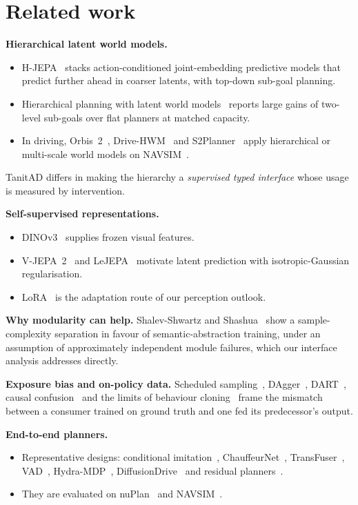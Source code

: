\documentclass[10pt,twocolumn]{article}
\theoremstyle{remark}
\begin{document}
\section{Related work}
\textbf{Hierarchical latent world models.}
\begin{itemize}
  \item H-JEPA~\cite{hjepa} stacks action-conditioned joint-embedding predictive models that predict further ahead in coarser latents,
        with top-down sub-goal planning.
  \item Hierarchical planning with latent world models~\cite{hplwm} reports large gains of two-level sub-goals over flat planners at
        matched capacity.
  \item In driving, Orbis~2~\cite{orbis2}, Drive-HWM~\cite{drivehwm} and S2Planner~\cite{s2planner} apply hierarchical or multi-scale
        world models on NAVSIM~\cite{navsim}.
\end{itemize}
TanitAD differs in making the hierarchy a \emph{supervised typed interface} whose usage is measured by intervention.

\textbf{Self-supervised representations.}
\begin{itemize}
  \item DINOv3~\cite{dinov3} supplies frozen visual features.
  \item V-JEPA~2~\cite{vjepa2} and LeJEPA~\cite{lejepa} motivate latent prediction with isotropic-Gaussian regularisation.
  \item LoRA~\cite{lora} is the adaptation route of our perception outlook.
\end{itemize}

\textbf{Why modularity can help.} Shalev-Shwartz and Shashua~\cite{ssshashua} show a sample-complexity separation in favour of
semantic-abstraction training, under an assumption of approximately independent module failures, which our interface analysis
addresses directly.

\textbf{Exposure bias and on-policy data.} Scheduled sampling~\cite{schedsamp}, DAgger~\cite{dagger}, DART~\cite{dart}, causal
confusion~\cite{causalconf} and the limits of behaviour cloning~\cite{bclimits} frame the mismatch between a consumer trained on
ground truth and one fed its predecessor's output.

\textbf{End-to-end planners.}
\begin{itemize}
  \item Representative designs: conditional imitation~\cite{cil}, ChauffeurNet~\cite{chauffeurnet}, TransFuser~\cite{transfuser},
        VAD~\cite{vad}, Hydra-MDP~\cite{hydramdp}, DiffusionDrive~\cite{diffusiondrive} and residual planners~\cite{resad}.
  \item They are evaluated on nuPlan~\cite{nuplan} and NAVSIM~\cite{navsim}.
\end{itemize}
\end{document}
